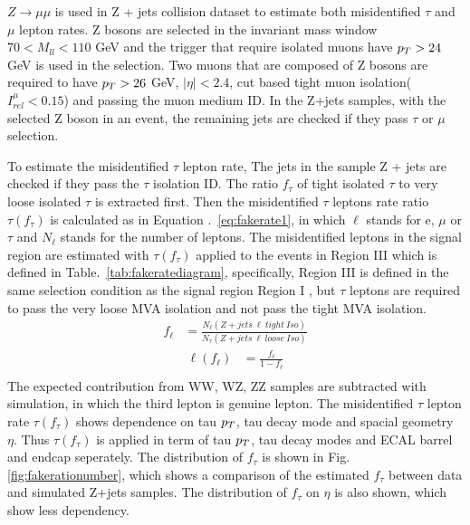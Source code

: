 $Z\rightarrow\mu\mu$ is used in Z + jets collision dataset to estimate both misidentified $\tau$ and $\mu$ lepton rates. Z bosons are selected in the invariant mass window $70<M_{ll}<110$ GeV and the trigger that require isolated muons have $p_{T}>24$ GeV is used in the selection. Two muons that are composed of Z bosons are required to have $p_{T}>26$ GeV, $|\eta|<2.4$, cut based tight muon isolation($I^{\mu}_{rel}<0.15$) and passing the muon medium ID. In the Z+jets samples, with the selected Z boson in an event, the remaining jets are checked if they pass $\tau$ or $\mu$ selection.

To estimate the misidentified $\tau$ lepton rate, The jets in the sample Z + jets are checked if they pass the $\tau$ isolation ID. The ratio $f_{\tau}$ of tight isolated $\tau$ to very loose isolated $\tau$ is extracted first. Then the misidentified $\tau$ leptons rate ratio $\tau(f_{\tau})$ is calculated as in Equation .~\ref{eq:fakerate1}, in which $\ell$ stands for e, $\mu$ or $\tau$ and $N_{\ell}$ stands for the number of leptons. The misidentified leptons in the signal region are estimated with $\tau(f_{\tau})$ applied to the events in Region III which is defined in Table.~\ref{tab:fakeratediagram}, specifically, Region III is defined in the same selection condition as the signal region Region I , but  $\tau$ leptons are required to pass the very loose MVA isolation and not pass the tight MVA isolation.
\begin{align} 
f_{\ell}&=\frac{N_{\ell}(Z+jets\ \ell \ tight\ Iso)}{N_{\tau}(Z+jets\ \ell \ loose\ Iso)} \label{eq:fakerate2}
\end{align}
\begin{align}
\ell(f_{\ell})&=\frac{f_{\ell}}{1-f_{\ell}} \label{eq:fakerate1}\\
\end{align}
The expected contribution from WW, WZ, ZZ samples are subtracted with simulation, in which the third lepton is genuine lepton. The misidentified $\tau$ lepton rate $\tau(f_{\tau})$ shows dependence on tau $p_{T}$, tau decay mode and spacial geometry $\eta$. Thus $\tau(f_{\tau})$ is applied in term of tau $p_{T}$, tau decay modes and ECAL barrel and endcap seperately. The distribution of $f_{\tau}$ is shown in Fig.~ \ref{fig:fakerationumber}, which shows a comparison of the estimated $f_{\tau}$ between data and simulated Z+jets samples. The distribution of $f_{\tau}$ on $\eta$ is also shown, which show less dependency. 

